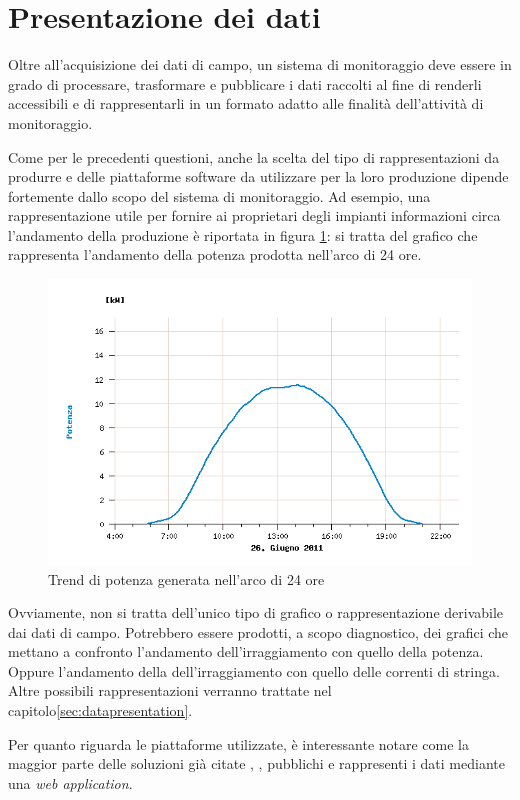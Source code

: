\section{Presentazione dei dati}
Oltre all'acquisizione dei dati di campo, un sistema di monitoraggio deve essere in grado
di processare, trasformare e pubblicare i dati raccolti al fine di renderli accessibili e 
di rappresentarli in un formato adatto alle finalit\`a dell'attivit\`a di monitoraggio.
%

%
Come per le precedenti questioni, anche la scelta del tipo di rappresentazioni da produrre 
e delle piattaforme software da utilizzare per la loro produzione dipende fortemente 
dallo scopo del sistema di monitoraggio.
%
Ad esempio, una rappresentazione utile per fornire ai proprietari degli impianti 
informazioni circa l'andamento della produzione \`e riportata in figura 
\ref{esempiopotenza}: si tratta del grafico che rappresenta l'andamento della 
potenza prodotta nell'arco di 24 ore.
%
\begin{figure}[!hpb]
\centering
\includegraphics[width=350pt]{img/fv-trend-potenza.jpg}
\caption{Trend di potenza generata nell'arco di 24 ore}
\label{esempiopotenza}
\end{figure}
%

%
Ovviamente, non si tratta dell'unico tipo di grafico o rappresentazione derivabile dai 
dati di campo. Potrebbero essere prodotti, a scopo diagnostico, dei grafici che mettano a 
confronto l'andamento dell'irraggiamento con quello della potenza. Oppure l'andamento 
della dell'irraggiamento con quello delle correnti di stringa.
%
Altre possibili rappresentazioni verranno trattate nel capitolo\ref{sec:datapresentation}.
%

%
Per quanto riguarda le piattaforme utilizzate, \`e interessante notare come la
maggior parte delle soluzioni gi\`a citate \cite{kolodenny06}, \cite{xiaoli11}, 
\cite{dirks06} pubblichi e rappresenti i dati mediante una \emph{web application}.



